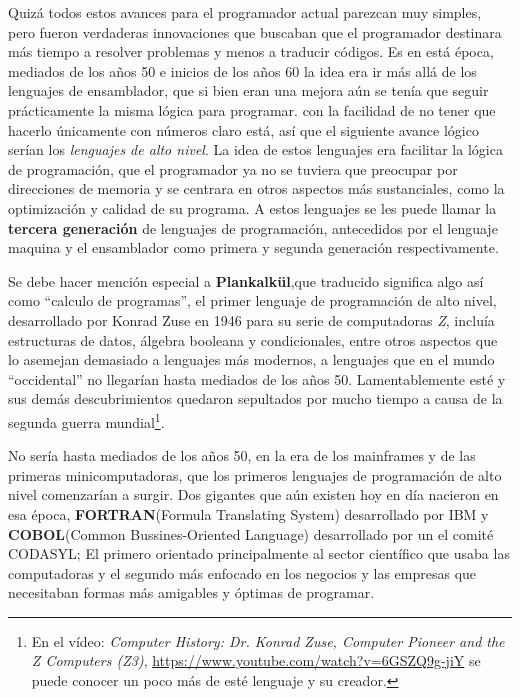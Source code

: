 \documentclass[letterpaper,12pt,oneside]{book}
\begin{document}
		Quizá todos estos avances para el programador actual parezcan muy simples, pero fueron verdaderas innovaciones que buscaban que el programador
		destinara más tiempo a resolver problemas y menos a traducir códigos. Es en está época, mediados de los años 50 e inicios de los años 60 la idea
		era ir más allá de los lenguajes de ensamblador, que si bien eran una mejora aún se tenía que seguir prácticamente la misma lógica para programar. con
		la facilidad de no tener que hacerlo únicamente con números claro está, así que el siguiente avance lógico serían los \textit{lenguajes de alto nivel}. La idea
		de estos lenguajes era facilitar la lógica de programación, que el programador ya no se tuviera que preocupar por direcciones de memoria y se centrara
		en otros aspectos más sustanciales, como la optimización y calidad de su programa. A estos lenguajes se les puede llamar la \textbf{tercera generación}
		de lenguajes de programación, antecedidos por el lenguaje maquina y el ensamblador como primera y segunda generación respectivamente\cite{oregan_brief_2012}.
		
		Se debe hacer mención especial a \textbf{Plankalk\"{u}l},que traducido significa algo así como ``calculo de programas'', el primer lenguaje de programación de alto 
		nivel, desarrollado por Konrad Zuse en 1946 para su serie
		de computadoras \textit{Z}, incluía estructuras de datos, álgebra booleana y condicionales, entre otros aspectos que lo asemejan demasiado a lenguajes más modernos, a
		lenguajes que en el mundo ``occidental'' no llegarían hasta mediados de los años 50. Lamentablemente esté y sus demás descubrimientos quedaron sepultados por mucho 
		tiempo a causa de la segunda guerra mundial\cite{oregan_brief_2012}\footnote{En el vídeo: \emph{Computer History: Dr. Konrad Zuse, Computer Pioneer and the Z 
		Computers (Z3)}, \url{https://www.youtube.com/watch?v=6GSZQ9g-jiY} se puede conocer un poco más de esté lenguaje y su creador.}.
		
		No sería hasta mediados de los años 50, en la era de los mainframes y de las primeras minicomputadoras, que los primeros lenguajes de programación
		de alto nivel comenzarían a surgir. Dos gigantes que aún existen hoy en día nacieron en esa época, \textbf{FORTRAN}(Formula Translating System) desarrollado por IBM y
		\textbf{COBOL}(Common Bussines-Oriented Language) desarrollado por un el comité CODASYL; El primero orientado principalmente al sector científico que usaba
		las computadoras y el segundo más enfocado en los negocios y las empresas que necesitaban formas más amigables y óptimas de programar\cite{oregan_brief_2012}.
		
\end{document}
